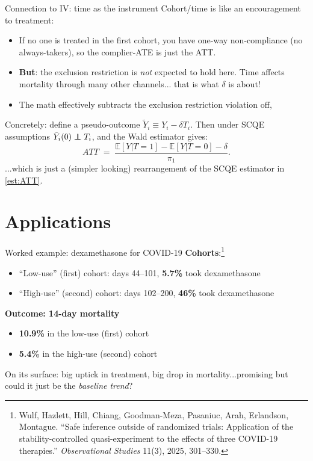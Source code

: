 \documentclass[xcolor=dvipsnames]{beamer}
\newcommand\E{\mathbb{E}}
\newcommand\indep{\protect\mathpalette{\protect\independenT}{\perp}}
\def\independenT#1#2{\mathrel{\rlap{$#1#2$}\mkern2mu{#1#2}}}
\begin{document}
\begin{frame}{Connection to IV: time as the instrument}
 Cohort/time is like an encouragement to treatment:
\small
\begin{itemize}
\item<2-> If no one is treated in the first cohort, you have one-way non-compliance (no always-takers), so the complier-ATE is just the ATT.
\item<3-> \textbf{But}: the exclusion restriction is \emph{not} expected to hold here. Time affects mortality through many other channels... that is what $\delta$ is about!
\item<4-> The math effectively subtracts the exclusion restriction violation off, 
\end{itemize}
\bigskip
\normalsize
{} Concretely: define a pseudo-outcome $\tilde Y_i \equiv Y_i - \delta T_i$. Then under SCQE assumptions $\tilde Y_i(0) \indep T_i$, and the Wald estimator gives:
\footnotesize
\[
ATT \;=\; \frac{\E[Y|T=1] - \E[Y|T=0] - \delta}{\pi_1}.
\]
...which is just a (simpler looking) rearrangement of the SCQE estimator in \eqref{est:ATT}.
\end{frame}

\section{Applications}

\begin{frame}{Worked example: dexamethasone for COVID-19}
\textbf{Cohorts}:\footnote{\scriptsize Wulf, Hazlett, Hill, Chiang, Goodman-Meza, Pasaniuc, Arah, Erlandson, Montague.
``Safe inference outside of randomized trials: Application of the stability-controlled quasi-experiment to the effects of three COVID-19 therapies.''
\emph{Observational Studies} 11(3), 2025, 301--330.}
\small
\begin{itemize}
\item ``Low-use'' (first) cohort: days 44--101, \textbf{5.7\%} took dexamethasone
\item ``High-use'' (second) cohort:  days 102--200, \textbf{46\%} took dexamethasone
\end{itemize}
\bigskip
\normalsize
{} \textbf{Outcome: 14-day mortality}
\small
\begin{itemize}
\item \textbf{10.9\%} in the low-use (first) cohort
\item \textbf{5.4\%} in the high-use (second) cohort
\end{itemize}
\bigskip
\normalsize
{} On its surface: big uptick in treatment, big drop in mortality...promising but could it just be the \emph{baseline trend}?
\end{frame}
\end{document}
